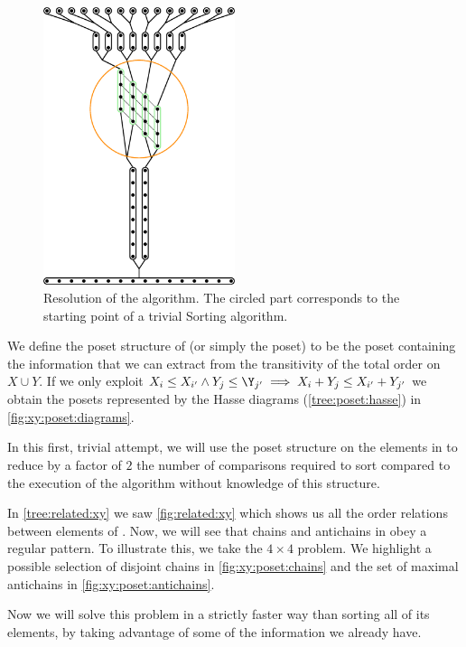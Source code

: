 \begin{figure}
\centering
\includegraphics[width=0.5\textwidth,angle=90]{fig/x+y/poset/mergexy}
\caption{Resolution of the \mergesort algorithm. The circled part
corresponds to the starting point of a trivial Sorting \XY algorithm.}
\label{fig:xy:poset:mergexy}
\end{figure}

We define the poset structure of \XY (or simply the \XY poset) to be the poset
containing the information that we can extract from the transitivity of the
total order on \(X \cup Y\). If we only exploit
\(X_i \le X_{i'} \land Y_j \le \Y_{j'} \implies X_i + Y_j \le X_{i'} + Y_{j'}\)
we obtain the posets represented by the Hasse diagrams (\ref{tree:poset:hasse})
in \ref{fig:xy:poset:diagrams}.

In this first, trivial attempt, we will use the poset structure on the elements
in \XY to reduce by a factor of $2$ the number of comparisons
required to sort \XY compared to the execution of the \mergesort algorithm
without knowledge of this structure.

In \ref{tree:related:xy} we saw \ref{fig:related:xy} which shows us all the order
relations between elements of \XY. Now, we will see that chains and antichains
in \XY obey a regular pattern. To illustrate this, we take the $4 \times 4$
\XY problem. We highlight a possible selection of disjoint chains in
\ref{fig:xy:poset:chains} and the set of maximal antichains in
\ref{fig:xy:poset:antichains}.

Now we will solve this problem in a strictly faster way than sorting all
of its elements, by taking advantage of some of the information we already have.

